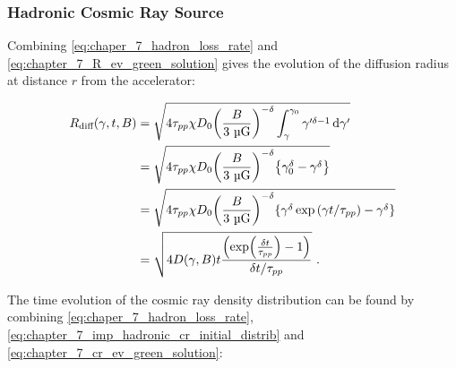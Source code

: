 \subsubsection{Hadronic Cosmic Ray Source}

Combining \autoref{eq:chaper_7_hadron_loss_rate} and \autoref{eq:chapter_7_R_ev_green_solution} gives the evolution of the diffusion radius at distance $r$ from the accelerator:

\begin{equation}
	\begin{aligned}
		R_\text{diff}\qty(\gamma,t,B)&=\sqrt{4\tau_{pp}\chi D_0\qty(\frac{B}{3~\si{\micro G}})^{-\delta}\int_\gamma^{\gamma_0}\gamma'^{\delta-1}\dd{\gamma'}} \\
		&=\sqrt{4\tau_{pp}\chi D_0\qty(\frac{B}{3~\si{\micro G}})^{-\delta}\qty{\gamma_0^\delta-\gamma^\delta}} \\
		&=\sqrt{4\tau_{pp}\chi D_0\qty(\frac{B}{3~\si{\micro G}})^{-\delta}\qty{\gamma^\delta\exp\qty(\gamma t/\tau_{pp})-\gamma^\delta}} \\
		&=\sqrt{4D\qty(\gamma,B)t\frac{\qty(\exp(\frac{\delta t}{\tau_{pp}})-1)}{\delta t/\tau_{pp}}}\text{ .}
	\end{aligned} \label{eq:chapter_7_Rdiff_hadronic_impulsive}
\end{equation} 

The time evolution of the cosmic ray density distribution can be found by combining \autoref{eq:chaper_7_hadron_loss_rate}, \autoref{eq:chapter_7_imp_hadronic_cr_initial_distrib} and \autoref{eq:chapter_7_cr_ev_green_solution}:

